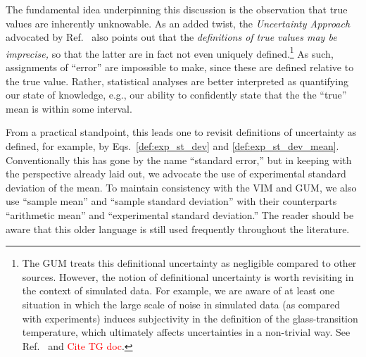 The fundamental idea underpinning this discussion is the observation that true values are inherently unknowable.
As an added twist, the {\it Uncertainty Approach} advocated by Ref.~\citep{JCGM:GUM2008} also points out that the {\it definitions of true values may be imprecise,} so that the latter are in fact not even uniquely defined.\footnote{The GUM treats this definitional uncertainty as negligible compared to other sources.
However, the notion of definitional uncertainty is worth revisiting in the context of simulated data.
For example, we are aware of at least one situation in which the large scale of noise in simulated data (as compared with experiments) induces subjectivity in the definition of the glass-transition temperature, which ultimately affects uncertainties in a non-trivial way.
See Ref.~\citep{patrone1} and \textcolor{red}{Cite TG doc}.}
As such, assignments of ``error'' are impossible to make, since these are defined relative to the true value.
Rather, statistical analyses are better interpreted as quantifying our state of knowledge, e.g., our ability to confidently state that the the ``true'' mean is within some interval.

From a practical standpoint, this leads one to revisit definitions of uncertainty as defined, for example, by Eqs.~\ref{def:exp_st_dev} and \ref{def:exp_st_dev_mean}.
Conventionally this has gone by the name ``standard error,'' but in keeping with the perspective already laid out, we advocate the use of experimental standard deviation of the mean.
To maintain consistency with the VIM and GUM, we also use ``sample mean'' and ``sample standard deviation'' with their counterparts ``arithmetic mean'' and ``experimental standard deviation.''
The reader should be aware that this older language is still used frequently throughout the literature.




